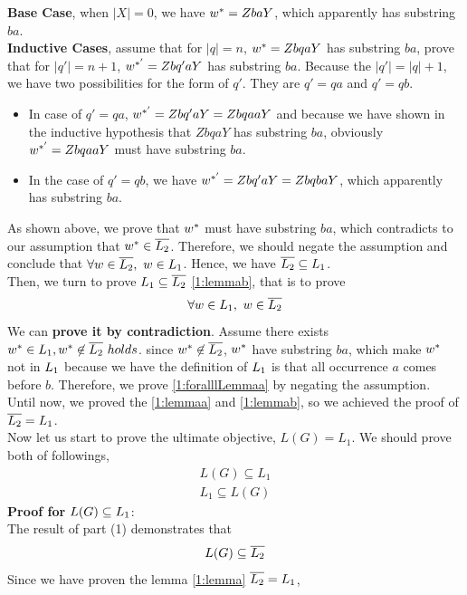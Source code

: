 \documentclass[11pt,a4paper]{article}
\newcommand{\htab}{\hspace*{0.63cm}}
\newcommand{\pg}{\\[0.3cm]}
\begin{document}
\htab \textbf{Base Case}, when $|X| = 0$, we have $w^{*} = ZbaY$, which apparently has substring $ba$. \\
\htab \textbf{Inductive Cases}, assume that for $|q| = n$, $w^{*} = ZbqaY$ has substring $ba$, prove that 
for $|q'| = n + 1$, $w^{*'} = Zbq'aY$ has substring $ba$. Because the $|q'| = |q| + 1$, we have two possibilities
for the form of $q'$. They are $q' = qa$ and $q' = qb$. 
\begin{itemize}
    \item{In case of $q' = qa$, $w^{*'} = Zbq'aY = ZbqaaY$ and because
        we have shown in the inductive hypothesis that $ZbqaY$ has substring $ba$, obviously $w^{*'} = ZbqaaY$ must have substring $ba$.}
    \item{In the case of $q' = qb$, we have $w^{*'} = Zbq'aY = ZbqbaY$, which apparently has substring $ba$. } 
\end{itemize}
\htab As shown above, we prove that $w^{*}$ must have substring $ba$, which contradicts to our assumption that 
$w^{*} \in \overline{L_{2}}$. Therefore, we should negate the assumption and conclude that
    $\forall w \in \overline{L_{2}},\ w \in L_{1}$. Hence, we have $\overline{L_{2}} \subseteq L_{1}$.\pg
\htab Then, we turn to prove $L_{1} \subseteq \overline{L_{2}}$ \eqref{1:lemmab}, that is to prove
\begin{align}
    \forall w \in L_{1},\ w \in \overline{L_{2}} \label{1:foralllLemmaa}
\end{align}
\htab We can \textbf{prove it by contradiction}. Assume there exists $w^{*} \in L_{1}, w^{*} \not \in \overline{L_{2}} \ holds$.
since $w^{*} \not \in \overline{L_{2}}$, $w^{*}$ have substring $ba$, which make $w^{*}$ not in $L_{1}$ because we 
have the definition of $L_{1}$ is that all occurrence $a$ comes before $b$. Therefore, we prove 
\eqref{1:foralllLemmaa} by negating the assumption. \\
\htab Until now, we proved the \eqref{1:lemmaa} and \eqref{1:lemmab}, 
so we achieved the proof of $\overline{L_{2}} = L_{1}$. \pg
\htab Now let us start to prove the ultimate objective, $L(G) = L_{1}$. We should prove both of followings, 
\begin{align}
    L(G) \subseteq L_{1} \\
    L_{1} \subseteq L(G) 
    \end{align}
\htab \textbf{Proof for $L(G) \subseteq L_{1}$}:\\
\htab The result of part (1) demonstrates that 
\begin{align}
    L(G) \subseteq \overline{L_{2}}
    \end{align}
\htab Since we have proven the lemma \eqref{1:lemma} $\overline{L_{2}} = L_{1}$, 
\end{document}

